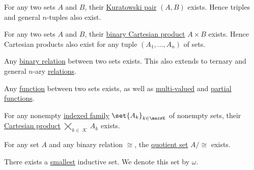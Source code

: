 \begin{proposition}
\begin{thmenum}
     For any two sets \( A \) and \( B \), their \hyperref[def:binary_cartesian_product]{Kuratowski pair} \( (A, B) \) exists. Hence triples and general \( n \)-tuples also exist.

     For any two sets \( A \) and \( B \), their \hyperref[def:binary_cartesian_product]{binary Cartesian product} \( A \times B \) exists. Hence Cartesian products also exist for any tuple \( (A_1, \ldots, A_n) \) of sets.

     Any \hyperref[def:binary_relation]{binary relation} between two sets exists. This also extends to ternary and general \( n \)-ary \hyperref[def:relation]{relations}.

     Any \hyperref[def:function]{function} between two sets exists, as well as \hyperref[def:multi_valued_function]{multi-valued} and \hyperref[def:partial_function]{partial functions}.

     For any nonempty \hyperref[def:indexed_family]{indexed family} \( \set{ A_k }_{k \in \mscrK} \) of nonempty sets, their \hyperref[def:cartesian_product]{Cartesian product} \( \bigtimes_{k \in \mscrK} A_k \) exists.

     For any set \( A \) and any binary relation \( \cong \), the \hyperref[def:equivalence_relation/quotient]{quotient set} \( A / {\cong} \) exists.

     There exists a \hyperref[def:poset_extremal_points/maximum_and_minimum]{smallest} inductive set. We denote this set by \( \omega \).
  \end{thmenum}
\end{proposition}
